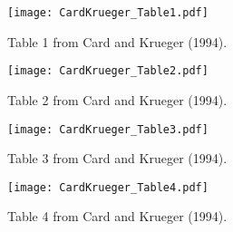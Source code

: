 \documentclass{article}
\begin{document}
\setcounter{table}{0} \renewcommand{\thetable}{\arabic{table}} 


\begin{table}[!htb]
\centering
  \texttt{[image: CardKrueger\_Table1.pdf]}
  \caption{Table 1 from Card and Krueger (1994).}
  \label{fig:CK_Tab1}
\end{table}


\begin{table}[!htb]
\centering
  \texttt{[image: CardKrueger\_Table2.pdf]}
  \caption{Table 2 from Card and Krueger (1994).}
  \label{fig:CK_Tab2}
\end{table}

\newpage
\begin{table}[!htb]
\centering
  \texttt{[image: CardKrueger\_Table3.pdf]}
  \caption{Table 3 from Card and Krueger (1994).}
  \label{fig:CK_Tab3}
\end{table}

\begin{table}[!htb]
\centering
  \texttt{[image: CardKrueger\_Table4.pdf]}
  \caption{Table 4 from Card and Krueger (1994).}
  \label{fig:CK_Tab4}
\end{table}
\end{document}
